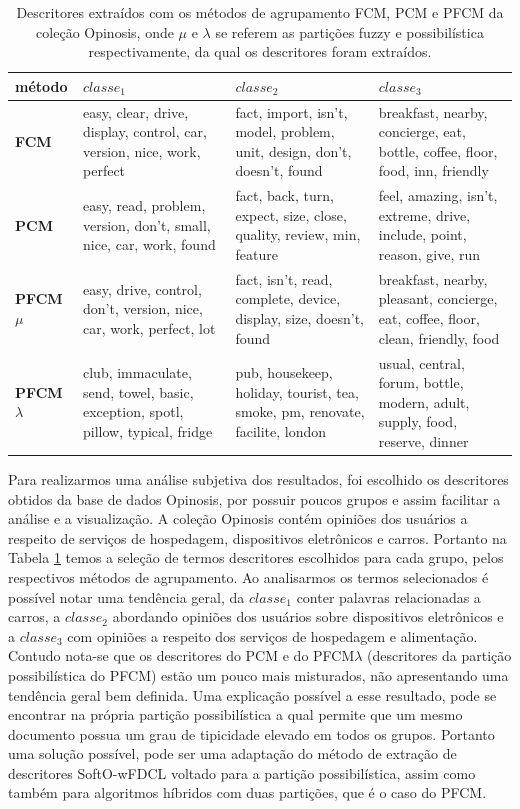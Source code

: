 \begin{table}[!htp]
  \centering
  \begin{tabular}{ |l|p{4cm} | p{4cm} | p{4cm}|}
    \hline
    {\bf método} & $classe_1$ & $classe_2$ & $classe_3$ \\
    \hline
    {\bf FCM} & easy, clear, drive, display, control, car, version, nice, work, perfect & fact,
    import, isn't, model, problem, unit, design, don't, doesn't, found & breakfast, nearby,
    concierge, eat, bottle, coffee, floor, food, inn, friendly \\
    \hline
    {\bf PCM} & easy, read, problem, version, don't, small, nice, car, work, found & fact, back,
    turn, expect, size, close, quality, review, min, feature & feel, amazing, isn't, extreme, drive,
    include, point, reason, give, run\\
    \hline
    {\bf PFCM $\mu$} & easy, drive, control, don't, version, nice, car, work, perfect, lot & fact,
    isn't, read, complete, device, display, size, doesn't, found & breakfast, nearby, pleasant,
    concierge, eat, coffee, floor, clean, friendly, food\\
    \hline
    {\bf PFCM $\lambda$} & club, immaculate, send, towel, basic, exception, spotl, pillow, typical,
    fridge & pub, housekeep, holiday, tourist, tea, smoke, pm, renovate, facilite, london & usual,
    central, forum, bottle, modern, adult, supply, food, reserve, dinner\\
    \hline
  \end{tabular}
  \caption{Descritores extraídos com os métodos de agrupamento FCM, PCM e PFCM da coleção Opinosis,
  onde $\mu$ e $\lambda$ se referem as partições fuzzy e possibilística respectivamente, da qual os
descritores foram extraídos.}
  \label{table:pfcmdescriptors}
\end{table}

Para realizarmos uma análise subjetiva dos resultados, foi escolhido os descritores obtidos da base
de dados Opinosis, por possuir poucos grupos e assim facilitar a análise e a visualização. A coleção
Opinosis contém opiniões dos usuários a respeito de serviços de hospedagem, dispositivos eletrônicos
e carros.  Portanto na Tabela \ref{table:pfcmdescriptors} temos a seleção de termos descritores
escolhidos para cada grupo, pelos respectivos métodos de agrupamento. Ao analisarmos os termos
selecionados é possível notar uma tendência geral, da $classe_1$ conter palavras relacionadas a
carros, a $classe_2$ abordando opiniões dos usuários sobre dispositivos eletrônicos e a $classe_3$
com opiniões a respeito dos serviços de hospedagem e alimentação. Contudo nota-se que os descritores
do PCM e do PFCM$\lambda$ (descritores da partição possibilística do PFCM) estão um pouco mais
misturados, não apresentando uma tendência geral bem definida. Uma explicação possível a esse
resultado, pode se encontrar na própria partição possibilística a qual permite que um mesmo
documento possua um grau de tipicidade elevado em todos os grupos. Portanto uma solução possível,
pode ser uma adaptação do método de extração de descritores SoftO-wFDCL voltado para a partição
possibilística, assim como também para algoritmos híbridos com duas partições, que é o caso do PFCM.

